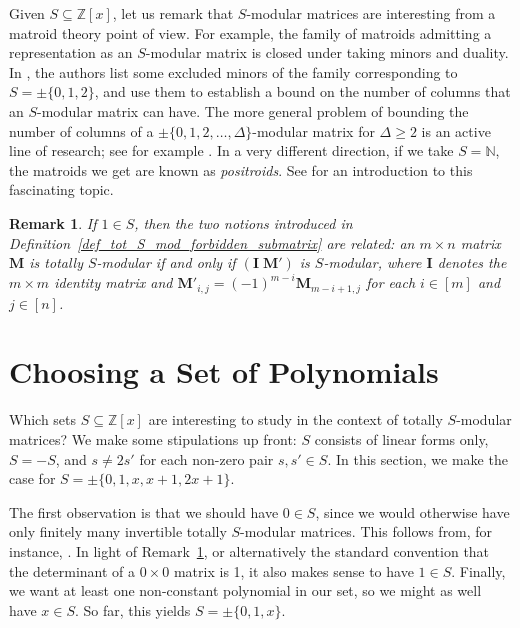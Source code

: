 \documentclass[a4paper, 11pt]{article}
\newcommand{\Z}{\mathbb{Z}}
\newcommand{\N}{\mathbb{N}}
\newcommand{\bM}{\bm{M}}
\newcommand{\indet}{x}
\newcommand{\polyring}{\Z[\indet]}
\newcommand{\polyS}{S}
\newcommand{\polyM}{\bM}
\newcommand{\id}{\bm{I}}
\newtheorem{remark}{Remark}
\begin{document}
	Given $\polyS\subseteq\polyring$, let us remark that $\polyS$-modular matrices are interesting from a matroid theory point of view. For example, the family of matroids admitting a representation as an $\polyS$-modular matrix is closed under taking minors and duality. In \cite{oxleywalsh2022bimodular}, the authors list some excluded minors of the family corresponding to $\polyS=\pm\{0,1,2\}$, and use them to establish a bound on the number of columns that an $\polyS$-modular matrix can have. The more general problem of bounding the number of columns of a $\pm\lbrace 0,1,2,\ldots,\Delta\rbrace$-modular matrix for $\Delta\geq 2$ is an active line of research; see for example \cite{averkovschymura24,GeelenNelsonWalsh2024,paatstallknecht2024forbiddenminors}. In a very different direction, if we take $\polyS=\N$, the matroids we get are known as \emph{positroids}. See \cite{postnikov2006total} for an introduction to this fascinating topic.


\begin{remark}\label{rem_S_modular_total_S_modular_equivalence}
If $1\in\polyS$, then the two notions introduced in Definition~\ref{def_tot_S_mod_forbidden_submatrix} are related: an $m\times n$ matrix $\polyM$ is totally $\polyS$-modular if and only if $(\id\;\polyM')$ is $S$-modular, where $\id$ denotes the $m\times m$ identity matrix and $\bM'_{i,j}=(-1)^{m-i}\bM_{m-i+1,j}$ for each $i\in [m]$ and $j\in [n]$.
\end{remark}	
	

\section{Choosing a Set of Polynomials}
\label{sec_smallest_nontrivial_cases}
Which sets $\polyS\subseteq\polyring$ are interesting to study in the context of totally $\polyS$-modular matrices? We make some stipulations up front: $\polyS$ consists of linear forms only, $\polyS=-\polyS$, and $s\neq 2s'$ for each non-zero pair $s,s'\in \polyS$. In this section, we make the case for $\polyS=\pm\{0,1,x,x+1,2x+1\}$.

The first observation is that we should have $0\in\polyS$, since we would otherwise have only finitely many invertible totally $\polyS$-modular matrices. This follows from, for instance, \cite[Lemma~7]{ARTMANN2016635}. In light of Remark~\ref{rem_S_modular_total_S_modular_equivalence}, or alternatively the standard convention that the determinant of a $0\times 0$ matrix is 1, it also makes sense to have $1\in\polyS$. Finally, we want at least one non-constant polynomial in our set, so we might as well have $x\in\polyS$. So far, this yields $\polyS=\pm\{0,1,x\}$.
\end{document}
